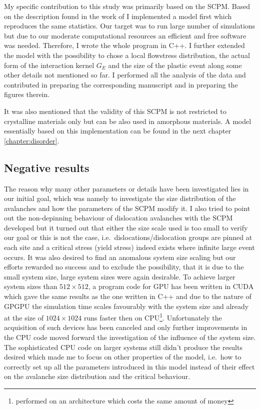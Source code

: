 My specific contribution to this study was primarily based on the SCPM. Based on the description found in the work of \citet{1742-5468-2005-08-P08004} I implemented a model first which reproduces the same statistics. Our target was to run large number of simulations but due to our moderate computational resources an efficient and free software was needed. Therefore, I wrote the whole program in C++. I further extended the model with the possibility to chose a local flowstress distribution, the actual form of the interaction kernel $G_E$ and the size of the plastic event along some other details not mentioned so far. I performed all the analysis of the data and contributed in preparing the corresponding manuscript and in preparing the figures therein.

It was also mentioned that the validity of this SCPM is not restricted to crystalline materials only but can be also used in amorphous materials. A model essentially based on this implementation can be found in the next chapter \ref{chapter:disorder}.

\subsection*{Negative results}

The reason why many other parameters or details have been investigated lies in our initial goal, which was namely to investigate the size distribution of the avalanches and how the parameters of the SCPM modify it. I also tried to point out the non-depinning behaviour of dislocation avalanches with the SCPM developed but it turned out that either the size scale used is too small to verify our goal or this is not the case, i.e.\ dislocations/dislocation groups are pinned at each site and a critical stress (yield stress) indeed exists where infinite large event occurs. It was also desired to find an anomalous system size scaling but our efforts rewarded no success and to exclude the possibility, that it is due to the small system size, large system sizes were again desirable. To achieve larger system sizes than $512 \times 512$, a program code for GPU has been written in CUDA which gave the same results as the one written in C++ and due to the nature of GPGPU the simulation time scales favourably with the system size and already at the size of $1024 \times 1024$ runs faster then on CPU\footnote{performed on an architecture which costs the same amount of money}. Unfortunately the acquisition of such devices has been canceled and only further improvements in the CPU code moved forward the investigation of the influence of the system size. The sophisticated CPU code on larger systems still didn't produce the results desired which made me to focus on other properties of the model, i.e.\ how to correctly set up all the parameters introduced in this model instead of their effect on the avalanche size distribution and the critical behaviour.

